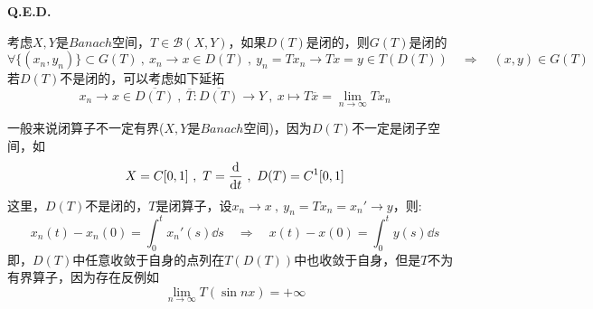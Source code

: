 \textbf{Q.E.D.}

考虑$X,Y$是$Banach$空间，$T \in \mathscr{B}(X,Y)$，如果$D(T)$是闭的，则$G(T)$是闭的
\[\forall\{(x_n,y_n)\} \subset G(T) \ , \ x_n \to x \in D(T) \ , \ y_n=Tx_n \to Tx=y \in T(D(T)) \quad \Rightarrow \quad (x,y) \in G(T)\]
若$D(T)$不是闭的，可以考虑如下延拓
\[x_n \to x \in \overline{D(T)} \ , \ \overline{T}:\overline{D(T)} \to Y \ , \ x \mapsto T\overline{x}=\lim_{n \to \infty}Tx_n\]

一般来说闭算子不一定有界($X,Y$是$Banach$空间)，因为$D(T)$不一定是闭子空间，如
\[X=C[0,1] \ , \ T=\dv{t} \ , \ D(T)=C^1[0,1]\]
这里，$D(T)$不是闭的，$T$是闭算子，设$x_n \to x \ , \ y_n=Tx_n=x_n' \to y$，则:
\[x_n(t)-x_n(0)=\int_0^tx_n'(s) \dd s \quad \Rightarrow \quad x(t)-x(0)=\int_0^ty(s) \dd s\]
即，$D(T)$中任意收敛于自身的点列在$T(D(T))$中也收敛于自身，但是$T$不为有界算子，因为存在反例如
\[\lim_{n \to \infty}T(\sin nx)=+\infty\]